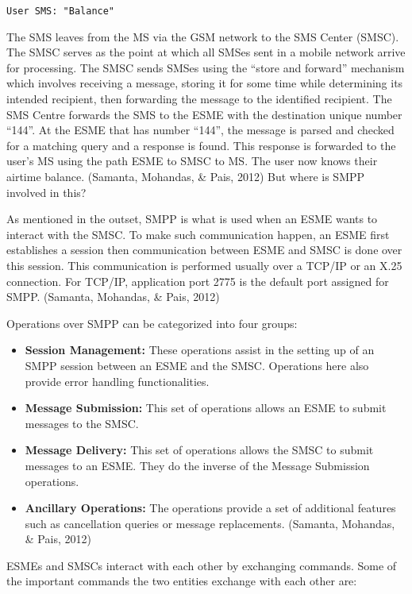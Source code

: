 \documentclass[12pt,svgnames,smaller]{article} %
\begin{document}
\begin{enumerate}
		\begin{center}
			\texttt{User SMS: "Balance" }
		\end{center}
		
		The SMS leaves from the MS via the GSM network to the SMS Center (SMSC). The SMSC serves as the point at which all SMSes sent in a mobile network arrive for processing. The SMSC sends SMSes using the “store and forward” mechanism which involves receiving a message, storing it for some time while determining its intended recipient, then forwarding the message to the identified recipient. The SMS Centre forwards the SMS to the ESME with the destination unique number “144”. At the ESME that has number “144”, the message is parsed and checked for a matching query and a response is found. This response is forwarded to the user’s MS using the path ESME to SMSC to MS. The user now knows their airtime balance. (Samanta, Mohandas, \& Pais, 2012) But where is SMPP involved in this?
		
		As mentioned in the outset, SMPP is what is used when an ESME wants to interact with the SMSC. To make such communication happen, an ESME first establishes a session then communication between ESME and SMSC is done over this session. This communication is performed usually over a TCP/IP or an X.25 connection. For TCP/IP, application port 2775 is the default port assigned for SMPP. (Samanta, Mohandas, \& Pais, 2012)
		
		Operations over SMPP can be categorized into four groups:
		
		\begin{itemize}
			\item \textbf{Session Management:}  These operations assist in the setting up of an SMPP session between an ESME and the SMSC. Operations here also provide error handling functionalities.
			\item \textbf{Message Submission:} This set of operations allows an ESME to submit messages to the SMSC.
			\item \textbf{Message Delivery:} This set of operations allows the SMSC to submit messages to an ESME. They do the inverse of the Message Submission operations.
			\item \textbf{Ancillary Operations:} The operations provide a set of additional features such as cancellation queries or message replacements. (Samanta, Mohandas, \& Pais, 2012)
		\end{itemize}
		
		ESMEs and SMSCs interact with each other by exchanging commands. Some of the important commands the two entities exchange with each other are:
		

\end{enumerate}
\end{document}
